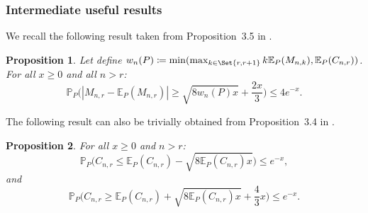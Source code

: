 \documentclass{article}
\newtheorem{proposition}{Proposition}
\newcommand{\1}{\boldsymbol{1}}
\newcommand{\EE}{\mathbb{E}}
\newcommand{\PP}{\mathbb{P}}
\theoremstyle{plain}
\begin{document}
\subsubsection{Intermediate useful results}

We recall the following result taken from Proposition~3.5 in \cite{Ben(17)}.
\begin{proposition}
  \label{pro:2}
  Let define $w_n(P) \coloneqq \min( \max_{k\in\Set{r,r+1}}k\EE_P(M_{n,k}) ,\EE_P(C_{n,r}))$. For all $x\geq 0$ and all $n > r$:
  \begin{equation*}
    \PP_P\Big( |M_{n,r} - \EE_P(M_{n,r})| \geq \sqrt{8w_n(P)x} + \frac{2x}{3} \Big) \leq 4e^{-x}.
  \end{equation*}
\end{proposition}


The following result can also be trivially obtained from Proposition~3.4 in \cite{Ben(17)}.
\begin{proposition}
  \label{pro:3}
  For all $x\geq 0$ and $n > r$:
  \begin{equation*}
    \PP_P\Big( C_{n,r} \leq \EE_P(C_{n,r}) - \sqrt{8\EE_P(C_{n,r})x} \Big)%
    \leq e^{-x},
  \end{equation*}
  and
  \begin{equation*}
    \PP_P\Big( C_{n,r} \geq \EE_P(C_{n,r}) + \sqrt{8\EE_P(C_{n,r})x} + \frac{4}{3}x \Big)%
    \leq e^{-x}.
  \end{equation*}
\end{proposition}
\end{document}

